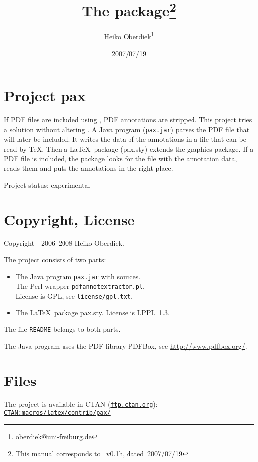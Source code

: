 \documentclass[pagesize=auto, parskip=half, fontsize=12pt, DIV=13]{scrartcl}
\title{The \pkg{pax} package\thanks{This manual corresponds to \pkg{pax.sty}~v0.1h, dated~2007/07/19}}
\author{Heiko Oberdiek\thanks{oberdiek@uni-freiburg.de}}
\date{2007/07/19}
\newcommand*{\pkg}[1]{\textsf{#1}}
\begin{document}
\maketitle

\tableofcontents

\section{Project \pkg{pax}}

If PDF files are included using \@, PDF annotations
are stripped. This project tries a solution without
altering \@. A Java program (\texttt{pax.jar}) parses the PDF file that
will later be included. It writes the data of the annotations
in a file that can be read by \TeX\@. Then a \LaTeX\ package (\pkg{pax.sty})
extends the graphics package. If a PDF file is included, the package
looks for the file with the annotation data, reads them and puts
the annotations in the right place.

Project status: experimental


\section{Copyright, License}

Copyright~\textcopyright\ 2006--2008 Heiko Oberdiek.

The project consists of two parts:
%
\begin{itemize}
\item
  The Java program \texttt{pax.jar} with sources. \\
  The Perl wrapper \texttt{pdfannotextractor.pl}. \\
  License is GPL, see \texttt{license/gpl.txt}.
\item
  The \LaTeX\ package \pkg{pax.sty}.
  License is LPPL~1.3.
\end{itemize}
%
The file \texttt{README} belongs to both parts.

The Java program uses the PDF library PDFBox,
see \url{http://www.pdfbox.org/}.


\section{Files}

The project is available in CTAN (\href{ftp://ftp.ctan.org/}{\texttt{ftp.ctan.org}}): \\
\href{http://ctan.org/macros/latex/contrib/pax/}{\texttt{CTAN:macros/latex/contrib/pax/}}
\end{document}
